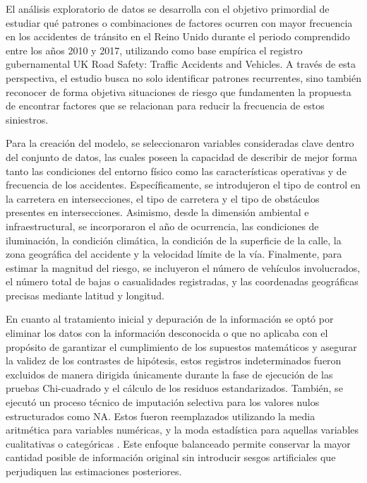 \documentclass[12pt]{article}
\begin{document}
  El análisis exploratorio de datos se desarrolla con el objetivo primordial de 
  estudiar qué patrones o combinaciones de factores ocurren con mayor frecuencia 
  en los accidentes de tránsito en el Reino Unido durante el periodo comprendido 
  entre los años 2010 y 2017, utilizando como base empírica el registro gubernamental 
  UK Road Safety: Traffic Accidents and Vehicles. A través de esta perspectiva, el 
  estudio busca no solo identificar patrones recurrentes, sino también reconocer de 
  forma objetiva situaciones de riesgo que fundamenten la propuesta de encontrar 
  factores que se relacionan para reducir la frecuencia de estos siniestros.
  
  Para la creación del modelo, se seleccionaron variables consideradas clave dentro 
  del conjunto de datos, las cuales poseen la capacidad de describir de mejor forma 
  tanto las condiciones del entorno físico como las características operativas y de
  frecuencia de los accidentes. Específicamente, se introdujeron el tipo de control 
  en la carretera en intersecciones, el tipo de carretera y el tipo de obstáculos 
  presentes en intersecciones. Asimismo, desde la dimensión ambiental e infraestructural, 
  se incorporaron el año de ocurrencia, las condiciones de iluminación, la condición climática, 
  la condición de la superficie de la calle, la zona geográfica del accidente y la 
  velocidad límite de la vía. Finalmente, para estimar la magnitud del riesgo, se 
  incluyeron el número de vehículos involucrados, el número total de bajas o 
  casualidades registradas, y las coordenadas geográficas precisas mediante 
  latitud y longitud.
  
  En cuanto al tratamiento inicial y depuración de la información se optó por 
  eliminar los datos con la información desconocida o que no aplicaba con el
  propósito de garantizar el cumplimiento de los supuestos matemáticos y asegurar 
  la validez de los contrastes de hipótesis, estos registros indeterminados 
  fueron excluidos de manera dirigida únicamente durante la fase de ejecución de
  las pruebas Chi-cuadrado y el cálculo de los residuos estandarizados. 
  También, se ejecutó un proceso técnico de imputación selectiva para los valores 
  nulos estructurados como NA. Estos fueron reemplazados utilizando la media 
  aritmética para variables numéricas, y la moda estadística para aquellas 
  variables cualitativas o categóricas \parencite{USECHE2006}. Este enfoque balanceado 
  permite conservar la mayor cantidad posible de información original sin introducir 
  sesgos artificiales que perjudiquen las estimaciones posteriores.
  
\end{document}
